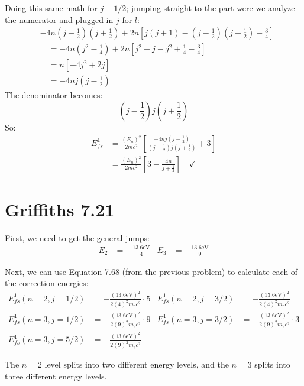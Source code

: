 \documentclass[11pt]{article}
\begin{document}
Doing this same math for $j-1/2$; jumping straight to the part were we analyze the numerator and plugged in $j$ for $l$:
\begin{align*}
&-4n\left(j-\frac{1}{2}\right)\left( j +\frac{1}{2}\right) + 2n\left[j(j+1)-\left(j-\frac{1}{2}\right)\left(j+\frac{1}{2}\right)-\frac{3}{4}\right]\\
& \quad = -4n\left(j^2-\frac{1}{4}\right) + 2n\left[j^2 +j-j^2+\frac{1}{4}-\frac{3}{4}\right]\\
& \quad = n\left[-4j^2+2j\right]\\
& \quad = -4nj\left(j-\frac{1}{2}\right)
\end{align*}
The denominator becomes:
\[\left(j-\frac{1}{2}\right)j\left(j+\frac{1}{2}\right)\]
So:
\begin{align*}
E_{fs}^1 & = \frac{(E_n)^2}{2mc^2}\left[\frac{-4nj\left(j-\frac{1}{2}\right)}{\left(j-\frac{1}{2}\right)j\left(j+\frac{1}{2}\right)}+3\right]\\
& = \frac{(E_n)^2}{2mc^2}\left[3-\frac{4n}{j+\frac{1}{2}}\right] \quad \checkmark
\end{align*}

\newpage

\section*{Griffiths 7.21}

First, we need to get the general jumps: 
\begin{align*}
E_2 & = -\frac{13.6 \text{eV}}{4} & E_3 & = -\frac{13.6 \text{eV}}{9}
\end{align*}

Next, we can use Equation 7.68 (from the previous problem) to calculate each of the correction energies:
\begin{align*}
E^1_{fs}(n=2, j=1/2) & = -\frac{(13.6 \text{eV})^2}{2(4)^2 m_ec^2}\cdot 5 & E^1_{fs}(n=2, j=3/2) &= -\frac{(13.6 \text{eV})^2}{2(4)^2 m_ec^2}\\
E^1_{fs}(n=3, j=1/2) & = -\frac{(13.6 \text{eV})^2}{2(9)^2m_ec^2}\cdot 9 & E^1_{fs}(n=3, j=3/2)& = - \frac{(13.6 \text{eV})^2}{2(9)^2m_ec^2}\cdot 3 \\
E^1_{fs}(n=3, j=5/2) & = -\frac{(13.6 \text{eV})^2}{2(9)^2m_ec^2}
\end{align*}

The $n=2$ level splits into two different energy levels, and the $n=3$ splits into three different energy levels.
\end{document}
